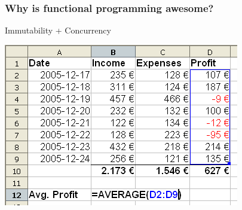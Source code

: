 \documentclass[12pt, xcolor=table]{beamer}
\begin{document}

\begin{frame}
    \frametitle{Why is functional programming awesome?}
    \begin{block}{Immutability + Concurrency}
        \begin{center}
            \includegraphics[scale=0.4]{figures/Spreadsheet.png}
        \end{center}
    \end{block}
\end{frame}

\end{document}

